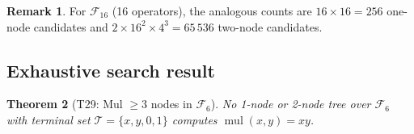 \documentclass[12pt,a4paper]{article}
\newtheorem{theorem}{Theorem}[section]
\theoremstyle{definition}
\newtheorem{remark}[theorem]{Remark}
\newcommand{\mul}{\operatorname{mul}}
\begin{document}
\begin{remark}
For $\mathcal{F}_{16}$ (16 operators), the analogous counts are
$16\times 16 = 256$ one-node candidates and
$2\times 16^2\times 4^3 = 65\,536$ two-node candidates.
\end{remark}

\subsection{Exhaustive search result}

\begin{theorem}[T29: Mul $\geq 3$ nodes in $\mathcal{F}_6$]\label{thm:T29}
No 1-node or 2-node tree over $\mathcal{F}_6$ with terminal set
$\mathcal{T}=\{x,y,0,1\}$ computes $\mul(x,y)=xy$.
\end{theorem}
\end{document}

